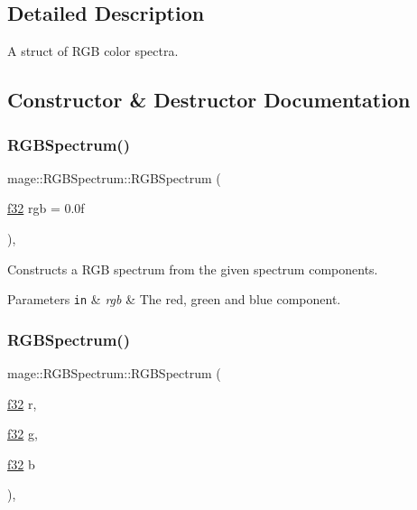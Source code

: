 \subsection{Detailed Description}
A struct of R\+GB color spectra. 

\subsection{Constructor \& Destructor Documentation}
\hypertarget{structmage_1_1_r_g_b_spectrum_a7aace65634e3c3cadcc2f0bbece707ad}{}\label{structmage_1_1_r_g_b_spectrum_a7aace65634e3c3cadcc2f0bbece707ad} 
\subsubsection{\texorpdfstring{R\+G\+B\+Spectrum()}{RGBSpectrum()}\hspace{0.1cm}{\footnotesize\ttfamily [1/7]}}
{\footnotesize\ttfamily mage\+::\+R\+G\+B\+Spectrum\+::\+R\+G\+B\+Spectrum (\begin{DoxyParamCaption}\item[{\hyperlink{namespacemage_a6a44ad388483959dc4dff9f2aef91431}{f32}}]{rgb = {\ttfamily 0.0f} }\end{DoxyParamCaption})\hspace{0.3cm}{\ttfamily [explicit]}, {\ttfamily [noexcept]}}

Constructs a R\+GB spectrum from the given spectrum components.


\begin{DoxyParams}[1]{Parameters}
\mbox{\tt in}  & {\em rgb} & The red, green and blue component. \\
\hline
\end{DoxyParams}
\hypertarget{structmage_1_1_r_g_b_spectrum_a0080ae94b64febe632775eb830fd3e90}{}\label{structmage_1_1_r_g_b_spectrum_a0080ae94b64febe632775eb830fd3e90} 
\subsubsection{\texorpdfstring{R\+G\+B\+Spectrum()}{RGBSpectrum()}\hspace{0.1cm}{\footnotesize\ttfamily [2/7]}}
{\footnotesize\ttfamily mage\+::\+R\+G\+B\+Spectrum\+::\+R\+G\+B\+Spectrum (\begin{DoxyParamCaption}\item[{\hyperlink{namespacemage_a6a44ad388483959dc4dff9f2aef91431}{f32}}]{r,  }\item[{\hyperlink{namespacemage_a6a44ad388483959dc4dff9f2aef91431}{f32}}]{g,  }\item[{\hyperlink{namespacemage_a6a44ad388483959dc4dff9f2aef91431}{f32}}]{b }\end{DoxyParamCaption})\hspace{0.3cm}{\ttfamily [explicit]}, {\ttfamily [noexcept]}}

